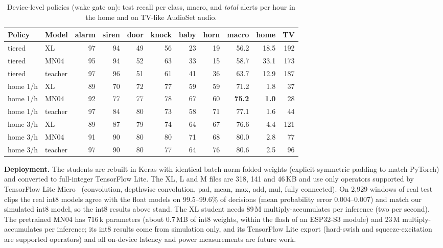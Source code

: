 \documentclass[conference]{IEEEtran}
\begin{document}
\begin{table}[t]\centering\caption{Device-level policies (wake gate on): test recall per class,
macro, and \emph{total} alerts per hour in the home and on TV-like AudioSet audio.}\label{tab:policy}
\setlength{\tabcolsep}{2pt}
\begin{tabular}{llrrrrrrrrr}\toprule
Policy & Model & alarm & siren & door & knock & baby & horn & macro & home & TV \\ \midrule
tiered & XL & 97 & 94 & 49 & 56 & 23 & 19 & 56.2 & 18.5 & 192 \\
tiered & MN04 & 95 & 94 & 52 & 63 & 33 & 15 & 58.7 & 33.1 & 173 \\
tiered & teacher & 97 & 96 & 51 & 61 & 41 & 36 & 63.7 & 12.9 & 187 \\
home 1/h & XL & 89 & 70 & 72 & 77 & 59 & 59 & 71.2 & 1.8 & 37 \\
home 1/h & MN04 & 92 & 77 & 77 & 78 & 67 & 60 & \textbf{75.2} & \textbf{1.0} & 28 \\
home 1/h & teacher & 97 & 84 & 80 & 73 & 58 & 71 & 77.1 & 1.6 & 44 \\
home 3/h & XL & 89 & 87 & 79 & 74 & 64 & 67 & 76.6 & 4.4 & 121 \\
home 3/h & MN04 & 91 & 90 & 80 & 80 & 71 & 68 & 80.0 & 2.8 & 77 \\
home 3/h & teacher & 97 & 90 & 80 & 77 & 64 & 76 & 80.6 & 2.5 & 96 \\ \bottomrule
\end{tabular}\end{table}

\textbf{Deployment.} The students are rebuilt in Keras with identical batch-norm-folded weights
(explicit symmetric padding to match PyTorch) and converted to full-integer TensorFlow Lite.
The XL, L and M files are 318, 141 and 46\,KB and use only operators supported by TensorFlow
Lite Micro~\cite{tflm} (convolution, depthwise convolution, pad, mean, max, add, mul, fully
connected). On 2{,}929 windows of real test clips the real int8 models agree with the float
models on 99.5--99.6\% of decisions (mean probability error 0.004--0.007) and match our simulated
int8 model, so the int8 results above stand. The XL student needs 89\,M multiply-accumulates per
inference (two per second). The pretrained MN04 has 716\,k parameters (about 0.7\,MB of int8
weights, within the flash of an ESP32-S3 module) and 23\,M multiply-accumulates per inference;
its int8 results come from simulation only, and its TensorFlow Lite export (hard-swish and
squeeze-excitation are supported operators) and all on-device latency and power measurements are
future work.
\end{document}
